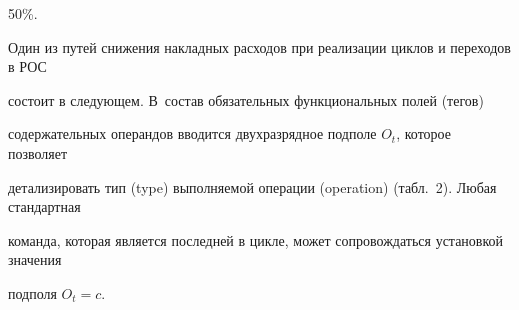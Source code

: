 50\%. 





Один из путей снижения накладных расходов при реализации циклов и переходов в РОС 


состоит в следующем. В~состав обязательных функциональных полей (тегов) 


содержательных операндов вводится двухразрядное подполе $O_t$, которое позволяет 


детализировать тип (type) выполняемой операции (operation) (табл.~2). Любая стандартная 


команда, которая является последней в цикле, может сопровождаться установкой значения 


подполя $O_t=c$.


       


